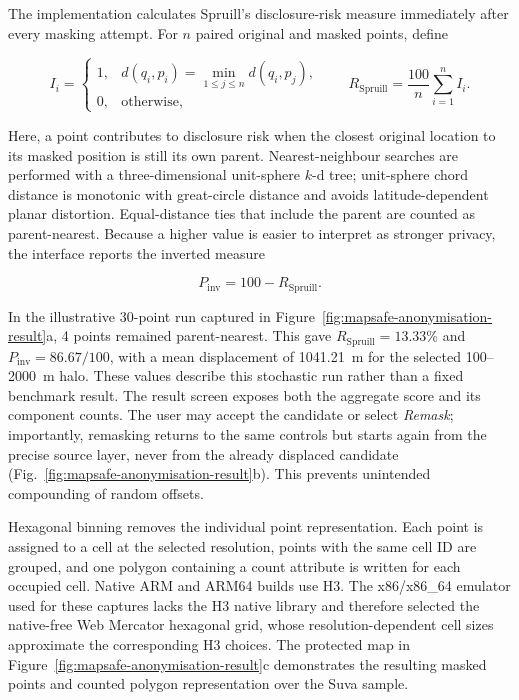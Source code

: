 The implementation calculates Spruill's disclosure-risk measure immediately
after every masking attempt.  For $n$ paired original and masked points, define

\begin{equation}
 I_i =
 \begin{cases}
 1, & d(q_i,p_i)=\min_{1\leq j\leq n} d(q_i,p_j),\\
 0, & \text{otherwise},
 \end{cases}
 \qquad
 R_{\mathrm{Spruill}}=\frac{100}{n}\sum_{i=1}^{n}I_i .
 \label{eq:spruill-risk}
\end{equation}

Here, a point contributes to disclosure risk when the closest original location
to its masked position is still its own parent.  Nearest-neighbour searches are
performed with a three-dimensional unit-sphere $k$-d tree; unit-sphere chord
distance is monotonic with great-circle distance and avoids latitude-dependent
planar distortion.  Equal-distance ties that include the parent are counted as
parent-nearest.  Because a higher value is easier to interpret as stronger
privacy, the interface reports the inverted measure

\begin{equation}
 P_{\mathrm{inv}} = 100-R_{\mathrm{Spruill}}.
 \label{eq:spruill-inverted}
\end{equation}

In the illustrative 30-point run captured in
Figure~\ref{fig:mapsafe-anonymisation-result}a, 4 points remained
parent-nearest.  This gave $R_{\mathrm{Spruill}}=13.33\%$ and
$P_{\mathrm{inv}}=86.67/100$, with a mean displacement of 1041.21~m for the
selected 100--2000~m halo.  These values describe this stochastic run rather
than a fixed benchmark result.  The result screen exposes both the aggregate
score and its component counts.  The user may accept the candidate or select
\emph{Remask}; importantly, remasking returns to the same controls but starts
again from the precise source layer, never from the already displaced
candidate (Fig.~\ref{fig:mapsafe-anonymisation-result}b).  This prevents
unintended compounding of random offsets.

Hexagonal binning removes the individual point representation.  Each point is
assigned to a cell at the selected resolution, points with the same cell ID are
grouped, and one polygon containing a count attribute is written for each
occupied cell.  Native ARM and ARM64 builds use H3.  The x86/x86\_64 emulator
used for these captures lacks the H3 native library and therefore selected the
native-free Web Mercator hexagonal grid, whose resolution-dependent cell sizes
approximate the corresponding H3 choices.  The protected map in
Figure~\ref{fig:mapsafe-anonymisation-result}c demonstrates the resulting
masked points and counted polygon representation over the Suva sample.

